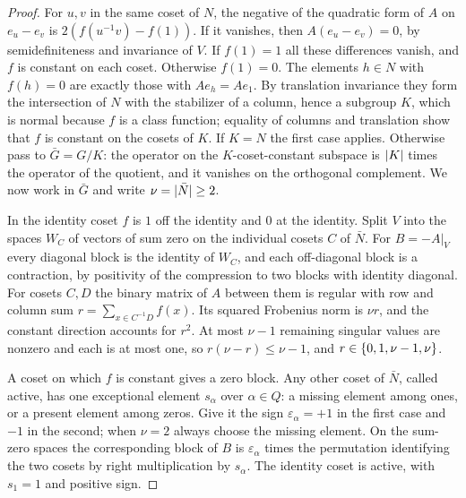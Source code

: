 \begin{proof}
For $u,v$ in the same coset of $N$, the negative of the quadratic form of $A$ on $e_u-e_v$
is $2(f(u^{-1}v)-f(1))$. If it vanishes, then $A(e_u-e_v)=0$, by semidefiniteness and
invariance of $V$. If $f(1)=1$ all these differences vanish, and $f$ is constant on each
coset. Otherwise $f(1)=0$. The elements $h\in N$ with $f(h)=0$ are exactly those with
$Ae_h=Ae_1$. By translation invariance they form the intersection of $N$ with the
stabilizer of a column, hence a subgroup $K$, which is normal because $f$ is a class
function; equality of columns and translation show that $f$ is constant on the cosets of
$K$. If $K=N$ the first case applies. Otherwise pass to $\bar G=G/K$: the operator on the
$K$-coset-constant subspace is $\lvert K\rvert$ times the operator of the quotient, and it vanishes
on the orthogonal complement. We now work in $\bar G$ and write $\nu=\lvert\bar N\rvert\ge2$.

In the identity coset $f$ is $1$ off the identity and $0$ at the identity. Split $V$ into
the spaces $W_C$ of vectors of sum zero on the individual cosets $C$ of $\bar N$. For
$B=-A|_V$ every diagonal block is the identity of $W_C$, and each off-diagonal block is a
contraction, by positivity of the compression to two blocks with identity diagonal. For
cosets $C,D$ the binary matrix of $A$ between them is regular with row and column sum
$r=\sum_{x\in C^{-1}D}f(x)$. Its squared Frobenius norm is $\nu r$, and the constant
direction accounts for $r^2$. At most $\nu-1$ remaining singular values are nonzero and
each is at most one, so $r(\nu-r)\le\nu-1$, and $r\in\{0,1,\nu-1,\nu\}$.

A coset on which $f$ is constant gives a zero block. Any other coset of $\bar N$, called
active, has one exceptional element $s_\alpha$ over $\alpha\in Q$: a missing element among
ones, or a present element among zeros. Give it the sign $\varepsilon_\alpha=+1$ in the
first case and $-1$ in the second; when $\nu=2$ always choose the missing element. On the
sum-zero spaces the corresponding block of $B$ is $\varepsilon_\alpha$ times the
permutation identifying the two cosets by right multiplication by $s_\alpha$. The identity
coset is active, with $s_1=1$ and positive sign.


\end{proof}
